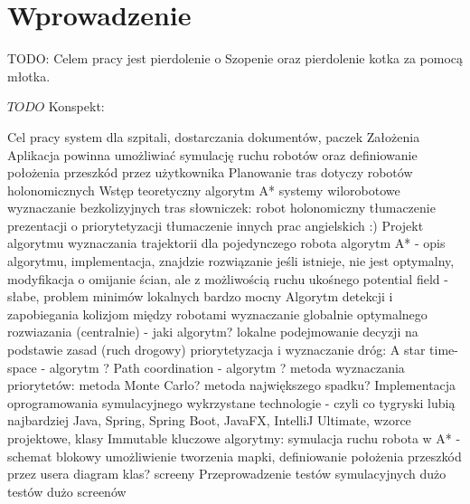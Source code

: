 \chapter{Wprowadzenie} %
\label{cha:wprowadzenie}

TODO: Celem pracy jest pierdolenie o Szopenie oraz pierdolenie kotka za pomocą młotka.


$TODO$ Konspekt:

Cel pracy
	system dla szpitali, dostarczania dokumentów, paczek
Założenia
	Aplikacja powinna umożliwiać symulację ruchu robotów oraz definiowanie położenia przeszkód przez użytkownika
	Planowanie tras dotyczy robotów holonomicznych
Wstęp teoretyczny
	algorytm A*
	systemy wilorobotowe
	wyznaczanie bezkolizyjnych tras
	słowniczek:
		robot holonomiczny
	tłumaczenie prezentacji o priorytetyzacji
	tłumaczenie innych prac angielskich :)
Projekt algorytmu wyznaczania trajektorii dla pojedynczego robota
	algorytm A* - opis algorytmu, implementacja, znajdzie rozwiązanie jeśli istnieje, nie jest optymalny, modyfikacja o omijanie ścian, ale z możliwością ruchu ukośnego
	potential field - słabe, problem minimów lokalnych bardzo mocny
Algorytm detekcji i zapobiegania kolizjom między robotami
	wyznaczanie globalnie optymalnego rozwiazania (centralnie) - jaki algorytm?
	lokalne podejmowanie decyzji na podstawie zasad (ruch drogowy)
	priorytetyzacja i wyznaczanie dróg:
		A star time-space - algorytm ?
		Path coordination - algorytm ?
		metoda wyznaczania priorytetów:
			metoda Monte Carlo?
			metoda największego spadku?
Implementacja oprogramowania symulacyjnego
	wykrzystane technologie - czyli co tygryski lubią najbardziej
	Java, Spring, Spring Boot, JavaFX, IntelliJ Ultimate, wzorce projektowe, klasy Immutable
	kluczowe algorytmy: symulacja ruchu robota w A* - schemat blokowy
	umożliwienie tworzenia mapki, definiowanie położenia przeszkód przez usera
	diagram klas?
	screeny
Przeprowadzenie testów symulacyjnych
	dużo testów
	dużo screenów
